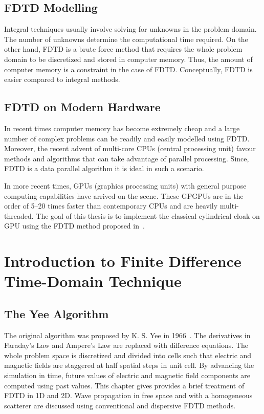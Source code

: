 \documentclass{report}
\begin{document}
\section{FDTD Modelling}
Integral techniques usually involve solving for unknowns in the problem domain. The number of unknowns determine the computational time required. On the other hand, FDTD is a brute force method that requires the whole problem domain to be discretized and stored in computer memory. Thus, the amount of computer memory is a constraint in the case of FDTD. Conceptually, FDTD is easier compared to integral methods.

\section{FDTD on Modern Hardware}
In recent times computer memory has become extremely cheap and a large number of complex problems can be readily and easily modelled using FDTD. Moreover, the recent advent of multi-core CPUs (central processing unit) favour methods and algorithms that can take advantage of parallel processing. Since, FDTD is a data parallel algorithm it is ideal in such a scenario.

In more recent times, GPUs (graphics processing units) with general purpose computing capabilities have arrived on the scene. These GPGPUs are in the order of 5--20 times faster than contemporary CPUs and are heavily multi-threaded. The goal of this thesis is to implement the classical cylindrical cloak on GPU using the FDTD method proposed in~\cite{Radial-Zhao}.

\chapter{Introduction to Finite Difference Time-Domain Technique}

\section{The Yee Algorithm}

The original algorithm was proposed by K. S. Yee in 1966~\cite{Yee1966}. The derivatives in Faraday's Law and Ampere's Law are replaced with difference equations. The whole problem space is discretized and divided into cells such that electric and magnetic fields are staggered at half spatial steps in unit cell. By advancing the simulation in time, future values of electric and magnetic field components are computed using past values. This chapter gives provides a brief treatment of FDTD in 1D and 2D. Wave propagation in free space and with a homogeneous scatterer are discussed using conventional and dispersive FDTD methods.
\end{document}
